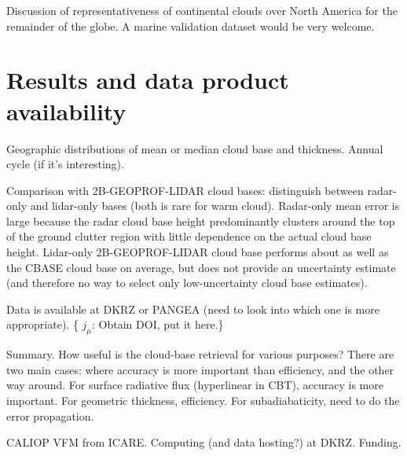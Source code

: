 \documentclass[amt,manuscript]{copernicus}\usepackage[]{graphicx}\usepackage[]{color}
\newcommand{\hlnum}[1]{\textcolor[rgb]{0.686,0.059,0.569}{#1}}%
\newcommand\comment[2]{\{\hlnum{ \textit{#1}: #2}\}}
\newcommand\commentjm[1]{\comment{$j_\mu$}{#1}}
\begin{document}
Discussion of representativeness of continental clouds over North America for
the remainder of the globe.  A marine validation dataset would be very welcome. 

\section{Results and data product availability}
\label{sec:results}

Geographic distributions of mean or median cloud base and thickness.  Annual
cycle (if it's interesting).  

Comparison with 2B-GEOPROF-LIDAR cloud bases: distinguish between radar-only and
lidar-only bases (both is rare for warm cloud).  Radar-only mean error is large
because the radar cloud base height predominantly clusters around the top of the
ground clutter region with little dependence on the actual cloud base height.
Lidar-only 2B-GEOPROF-LIDAR cloud base performs about as well as the CBASE cloud
base on average, but does not provide an uncertainty estimate (and therefore no
way to select only low-uncertainty cloud base estimates).

Data is available at DKRZ or PANGEA (need to look into which one is more
appropriate).  \commentjm{Obtain DOI, put it here.}

\conclusions
\label{sec:conclusions}
\par Summary.  How useful is the cloud-base retrieval for various purposes?
There are two main cases: where accuracy is more important than efficiency, and
the other way around.  For surface radiative flux (hyperlinear in CBT), accuracy
is more important.  For geometric thickness, efficiency.  For subadiabaticity,
need to do the error propagation.

\begin{acknowledgements}
CALIOP VFM from ICARE.  Computing (and data hosting?) at DKRZ.  Funding.
\end{acknowledgements}

\end{document}
